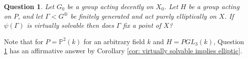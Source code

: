 \documentclass[12pt]{article}
\newtheorem{ques}[thm]{Question}
\theoremstyle{definition}
\begin{document}
\begin{ques}
    \label{ques: virtually solvable projection}
    Let $G_0$ be a group acting decently on $X_0$. Let $H$ be a group acting on $P$, and let $\Gamma < G^{\oplus}$ be finitely generated and act purely elliptically on $X$. If $\psi(\Gamma)$ is virtually solvable then does $\Gamma$ fix a point of $X$?
\end{ques}

Note that for $P = \mathbb{P}^2(k)$ for an arbitrary field $k$ and $H = PGL_3(k)$, Question \ref{ques: virtually solvable projection} has an affirmative answer by Corollary \ref{cor: virtually solvable implies elliptic}. 



\end{document}
